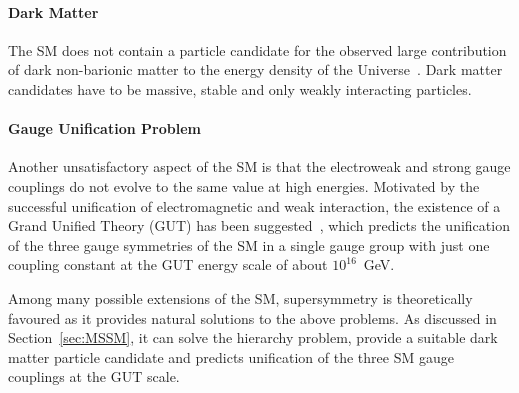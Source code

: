 \paragraph{Dark Matter}   The SM does not contain a particle candidate for the observed large contribution 
	of dark non-barionic  matter to the energy density of the Universe~\cite{darkmatter1,darkmatter2,darkmatter3}. 
	Dark matter candidates have to be massive, stable and only weakly interacting particles. 

\paragraph{Gauge Unification Problem}	Another unsatisfactory aspect of the SM is that the electroweak and strong 
	gauge couplings do not evolve to the same value at high energies. Motivated by the successful unification of electromagnetic and weak
	interaction, the existence of a Grand Unified Theory (GUT) has been 
	suggested~\cite{GUT1,GUT2}, which predicts the unification of  the three gauge symmetries of the SM  in a single gauge group with just one coupling constant
	 at the GUT energy scale of about $10^{16}$~GeV.

\vspace{0.5cm}
Among many possible extensions of the SM, supersymmetry is  theoretically  favoured  
as it provides natural solutions to the above problems. 
As discussed in Section~\ref{sec:MSSM}, it can solve  the hierarchy problem, provide a suitable dark matter particle candidate 
and predicts unification of the three SM gauge couplings at the GUT scale.


%
%


